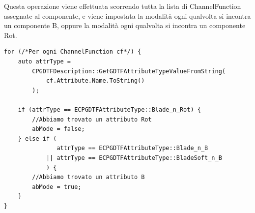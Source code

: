 \documentclass[main.tex]{subfiles}
\begin{document}
Questa operazione viene effettuata scorrendo tutta la lista di ChannelFunction assegnate al componente, e viene impostata la modalità  ogni qualvolta si incontra un componente B, oppure la modalità  ogni qualvolta si incontra un componente Rot.
\begin{lstlisting}
for (/*Per ogni ChannelFunction cf*/) {
    auto attrType =
        CPGDTFDescription::GetGDTFAttributeTypeValueFromString(
            cf.Attribute.Name.ToString()
        );

    if (attrType == ECPGDTFAttributeType::Blade_n_Rot) {
        //Abbiamo trovato un attributo Rot
        abMode = false;
    } else if (
               attrType == ECPGDTFAttributeType::Blade_n_B
            || attrType == ECPGDTFAttributeType::BladeSoft_n_B
            ) {
        //Abbiamo trovato un attributo B
        abMode = true;
    }
}
\end{lstlisting}
\end{document}
